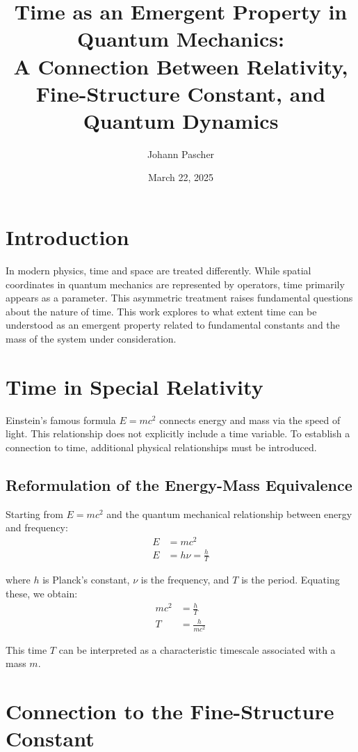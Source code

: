 \documentclass{article}
\title{Time as an Emergent Property in Quantum Mechanics: \\A Connection Between Relativity, Fine-Structure Constant, and Quantum Dynamics}
\author{Johann Pascher}
\date{March 22, 2025}
\begin{document}
	
	\maketitle
	
	\section{Introduction}
	
	In modern physics, time and space are treated differently. While spatial coordinates in quantum mechanics are represented by operators, time primarily appears as a parameter. This asymmetric treatment raises fundamental questions about the nature of time. This work explores to what extent time can be understood as an emergent property related to fundamental constants and the mass of the system under consideration.
	
	\tableofcontents
		
	\section{Time in Special Relativity}
	
	Einstein’s famous formula $E = mc^2$ connects energy and mass via the speed of light. This relationship does not explicitly include a time variable. To establish a connection to time, additional physical relationships must be introduced.
	
	\subsection{Reformulation of the Energy-Mass Equivalence}
	
	Starting from $E = mc^2$ and the quantum mechanical relationship between energy and frequency:
	\begin{align}
		E &= mc^2 \\
		E &= h\nu = \frac{h}{T}
	\end{align}
	
	where $h$ is Planck’s constant, $\nu$ is the frequency, and $T$ is the period. Equating these, we obtain:
	\begin{align}
		mc^2 &= \frac{h}{T} \\
		T &= \frac{h}{mc^2}
	\end{align}
	
	This time $T$ can be interpreted as a characteristic timescale associated with a mass $m$.
	
	\section{Connection to the Fine-Structure Constant}
	
\end{document}
